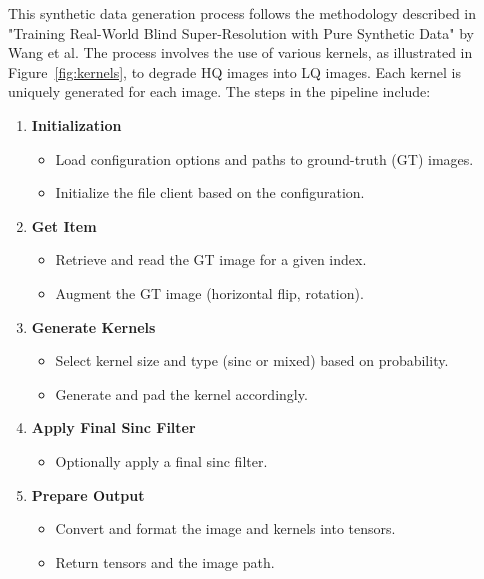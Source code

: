 This synthetic data generation process follows the methodology described in "Training Real-World Blind Super-Resolution with Pure Synthetic Data" by Wang et al. The process involves the use of various kernels, as illustrated in Figure~\ref{fig:kernels}, to degrade HQ images into LQ images. Each kernel is uniquely generated for each image. The steps in the pipeline include:

\begin{enumerate}
    \item \textbf{Initialization}
    \begin{itemize}
        \item Load configuration options and paths to ground-truth (GT) images.
        \item Initialize the file client based on the configuration.
    \end{itemize}
    
    \item \textbf{Get Item}
    \begin{itemize}
        \item Retrieve and read the GT image for a given index.
        \item Augment the GT image (horizontal flip, rotation).
    \end{itemize}
    
    \item \textbf{Generate Kernels}
    \begin{itemize}
        \item Select kernel size and type (sinc or mixed) based on probability.
        \item Generate and pad the kernel accordingly.
    \end{itemize}
    
    \item \textbf{Apply Final Sinc Filter}
    \begin{itemize}
        \item Optionally apply a final sinc filter.
    \end{itemize}
    
    \item \textbf{Prepare Output}
    \begin{itemize}
        \item Convert and format the image and kernels into tensors.
        \item Return tensors and the image path.
    \end{itemize}
\end{enumerate}

